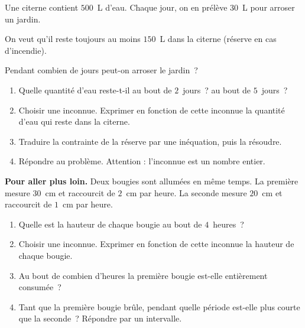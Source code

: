 \documentclass[a4paper,11pt,fleqn]{article}
\newcounter{temp}
\begin{document}
\vfill
\begin{EXO}{}{}
Une citerne contient $500$~L d'eau. Chaque jour, on en prélève $30$~L pour arroser un jardin.

On veut qu'il reste toujours au moins $150$~L dans la citerne (réserve en cas d'incendie).

Pendant combien de jours peut-on arroser le jardin~?
\begin{enumerate}[itemsep=0.8em]
	\item Quelle quantité d'eau reste-t-il au bout de $2$~jours~? au bout de $5$~jours~?
	\item Choisir une inconnue. Exprimer en fonction de cette inconnue la quantité d'eau qui reste dans la citerne.
	\item Traduire la contrainte de la réserve par une inéquation, puis la résoudre.
	\item Répondre au problème. Attention : l'inconnue est un nombre entier.
\end{enumerate}
\end{EXO}
\vfill
\begin{EXO}{}{}
\textbf{Pour aller plus loin.} Deux bougies sont allumées en même temps. La première mesure $30$~cm et raccourcit de $2$~cm par heure. La seconde mesure $20$~cm et raccourcit de $1$~cm par heure.
\begin{enumerate}[itemsep=0.8em]
	\item Quelle est la hauteur de chaque bougie au bout de $4$~heures~?
	\item Choisir une inconnue. Exprimer en fonction de cette inconnue la hauteur de chaque bougie.
	\item Au bout de combien d'heures la première bougie est-elle entièrement consumée~?
	\item Tant que la première bougie brûle, pendant quelle période est-elle plus courte que la seconde~? Répondre par un intervalle.
\end{enumerate}
\end{EXO}
\vfill
\clearpage

\ifdefined\ELEVE\else
\clearpage
{}
\end{document}
